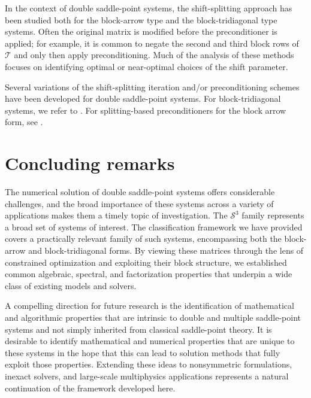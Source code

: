 \documentclass{article}
\newcommand{\st}{\mathcal{S}^3}
\newcommand{\sT}{\mathcal{T}}
\begin{document}
In the context of double saddle-point systems, the shift-splitting approach has been studied both for the block-arrow type and the block-tridiagonal type systems. Often the original matrix is modified before the preconditioner is applied; for example, it is common to negate the second and third block rows of $\sT$ and only then apply preconditioning. Much of the analysis of these methods focuses on identifying optimal or near-optimal choices of the shift parameter.

Several variations of the shift-splitting iteration and/or preconditioning schemes have been developed for double saddle-point systems. For block-tridiagonal systems, we refer to \cite{ak26, bhb23, c19,lxm25,lz24}. For splitting-based preconditioners for the block arrow form, see \cite{cr23,dl23,l24,lz19,mhl23,mlm21,rcw22}.



\section{Concluding remarks}
\label{sec:conclusion}

The numerical solution of double saddle-point systems offers considerable challenges, and the broad importance of these systems across a variety of applications makes them a timely topic of investigation. The $\st$ family represents a broad set of systems of interest. The classification framework we have provided covers a practically relevant family of such systems, encompassing both the block-arrow and block-tridiagonal forms. By viewing these matrices through the lens of constrained optimization and exploiting their block structure, we established common algebraic, spectral, and factorization properties that underpin a wide class of existing models and solvers.

A compelling direction for future research is the identification of mathematical and algorithmic properties that are intrinsic to double and multiple saddle-point systems and not simply inherited from classical saddle-point theory. It is desirable to identify mathematical and numerical properties that are unique to these systems in the hope that this can lead to solution methods that fully exploit those properties. Extending these ideas to nonsymmetric formulations, inexact solvers, and large-scale multiphysics applications represents a natural continuation of the framework developed here. 




\end{document}
